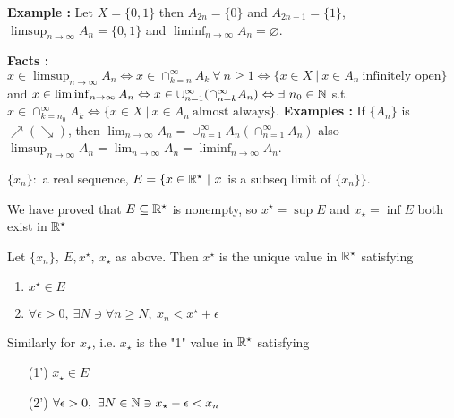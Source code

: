 \textbf{Example :} Let $X = \{0,1\}$ then $A_{2n} = \{0\}$ and $A_{2n-1} = \{1\}$, $\limsup_{n\to\infty}A_n = \{0,1\}$ and $\liminf_{n\to\infty}A_n = \varnothing$.

\textbf{Facts : }$x\in\limsup_{n\to\infty}A_n \Leftrightarrow x\in \cap_{k=n}^{\infty}A_k\ \forall\ n\geq 1 \Leftrightarrow \{x\in X\ |\ x\in A_n\ \text{infinitely open}\}$ and $x\in \liminf_{n\to\infty} A_n \Leftrightarrow x\in \cup_{n=1}^{\infty}(\cap_{n=k}^{\infty}A_n)\Leftrightarrow \exists\ n_0\in\N $ s.t. $x\in\cap_{k=n_0}^{\infty}A_k\Leftrightarrow \{x\in X\ |\ x\in A_n\ \text{almost always}\}$.
\textbf{Examples : } If $\{A_n\}$ is $\nearrow (\searrow)$, then $\lim_{n\to\infty}A_n = \cup_{n=1}^{\infty} A_n(\cap_{n=1}^{\infty} A_n)$ also $\limsup_{n\to\infty}A_n = \lim_{n\to\infty}A_n = \liminf_{n\to\infty} A_n$.

\newpage

$\{x_n\}:$ a real sequence, $E = \{x \in \mathbb{R}^{\star} ~|~ x $ is a subseq limit of $\{x_n\}\}$.

We have proved that $E \subseteq \mathbb{R}^{\star}$ is nonempty, so $x^{\star} = \sup E$ and $x_{\star} = \inf E$ both exist in $\mathbb{R}^{\star}$


\begin{thm*}
	Let $\{x_n\},~E,x^{\star},~x_{\star}$ as above. Then $x^{\star}$ is the unique value in $\mathbb{R}^{\star}$ satisfying
	
	\begin{enumerate}
		\item $x^{\star} \in E$
		\item $\forall \epsilon > 0,~\exists N \ni \forall n \geq N,~ x_n < x^{\star} + \epsilon$
	\end{enumerate}
	
	Similarly for $x_{\star}$, i.e. $x_{\star}$ is the "1" value in $\mathbb{R}^{\star}$ satisfying
	
	\begin{enumerate}
		\item[(1')] $x_{\star} \in E$
		\item[(2')] $\forall \epsilon > 0,~\exists N \in \mathbb{N} \ni x_{\star} - \epsilon < x_n$
	\end{enumerate}
\end{thm*}

